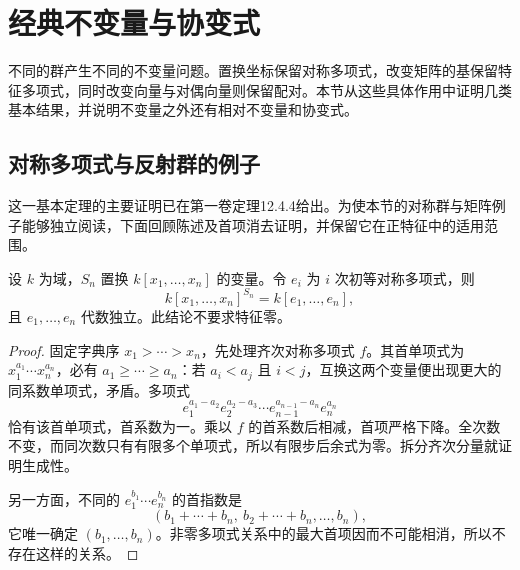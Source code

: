%
%
\section{经典不变量与协变式}
\label{b5:sec:2205}

不同的群产生不同的不变量问题。置换坐标保留对称多项式，改变矩阵的基保留特征多项式，同时改变向量与对偶向量则保留配对。本节从这些具体作用中证明几类基本结果，并说明不变量之外还有相对不变量和协变式。

\subsection{对称多项式与反射群的例子}
\label{b5:subsec:2205:01}

这一基本定理的主要证明已在第一卷定理12.4.4给出。为使本节的对称群与矩阵例子能够独立阅读，下面回顾陈述及首项消去证明，并保留它在正特征中的适用范围。

\begin{theorem}[对称多项式基本定理]\label{b5:thm:invariant-symmetric-polynomials}
	设 \(k\) 为域，\(S_n\) 置换 \(k[x_1,\ldots,x_n]\) 的变量。令 \(e_i\) 为 \(i\) 次初等对称多项式，则
	\[
		k[x_1,\ldots,x_n]^{S_n}=k[e_1,\ldots,e_n],
	\]
	且 \(e_1,\ldots,e_n\) 代数独立。此结论不要求特征零。
\end{theorem}
\begin{proof}
	固定字典序 \(x_1>\cdots>x_n\)，先处理齐次对称多项式 \(f\)。其首单项式为 \(x_1^{a_1}\cdots x_n^{a_n}\)，必有 \(a_1\ge\cdots\ge a_n\)：若 \(a_i<a_j\) 且 \(i<j\)，互换这两个变量便出现更大的同系数单项式，矛盾。多项式
	\[
		e_1^{a_1-a_2}e_2^{a_2-a_3}\cdots e_{n-1}^{a_{n-1}-a_n}e_n^{a_n}
	\]
	恰有该首单项式，首系数为一。乘以 \(f\) 的首系数后相减，首项严格下降。全次数不变，而同次数只有有限多个单项式，所以有限步后余式为零。拆分齐次分量就证明生成性。

	另一方面，不同的 \(e_1^{b_1}\cdots e_n^{b_n}\) 的首指数是
	\[
		(b_1+\cdots+b_n,\ b_2+\cdots+b_n,\ldots,b_n),
	\]
	它唯一确定 \((b_1,\ldots,b_n)\)。非零多项式关系中的最大首项因而不可能相消，所以不存在这样的关系。
\end{proof}


